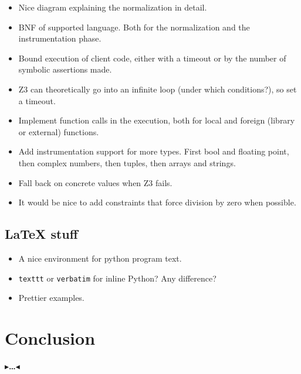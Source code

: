 \documentclass[11pt]{report}
\newcommand{\todo}[1]{{\color[rgb]{.5,0,0}\textbf{$\blacktriangleright$#1$\blacktriangleleft$}}}
\begin{document}
\begin{itemize}
  \item Nice diagram explaining the normalization in detail.
  \item BNF of supported language. Both for the normalization and the
    instrumentation phase.
  \item Bound execution of client code, either with a timeout or by
    the number of symbolic assertions made.
  \item Z3 can theoretically go into an infinite loop (under which
    conditions?), so set a timeout.
  \item Implement function calls in the execution, both for local and
    foreign (library or external) functions.
  \item Add instrumentation support for more types. First bool and
    floating point, then complex numbers, then tuples, then arrays and
    strings.
  \item Fall back on concrete values when Z3 fails.
  \item It would be nice to add constraints that force division by
    zero when possible.
\end{itemize}

\section{\LaTeX{} stuff}

\begin{itemize}
  \item A nice environment for python program text.
  \item {\tt texttt} or \verb|verbatim| for inline Python? Any
    difference?
  \item Prettier examples.
\end{itemize}


\chapter{Conclusion}
\label{ch:conclusion}

\todo{\dots}
\end{document}
